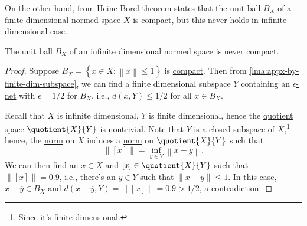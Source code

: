 On the other hand, from \hyperref[thm:Heine-Borel]{Heine-Borel theorem} states that the unit \hyperref[def:ball]{ball} \(B_X\) of a finite-dimensional \hyperref[def:normed-vector-space]{normed space} \(X\) is \hyperref[def:compact]{compact}, but this never holds in infinite-dimensional case.

\begin{theorem}\label{thm:Riesz}
	The unit \hyperref[def:ball]{ball} \(B_X\) of an infinite dimensional \hyperref[def:normed-vector-space]{normed space} is never \hyperref[def:compact]{compact}.
\end{theorem}
\begin{proof}
	Suppose \(B_X= \left\{ x\in X\colon \left\lVert x\right\rVert \leq 1 \right\} \) is \hyperref[def:compact]{compact}. Then from \autoref{lma:appx-by-finite-dim-subspace}, we can find a finite dimensional subspace \(Y\) containing an \hyperref[def:eps-net]{\(\epsilon\)-net} with \(\epsilon = 1 / 2\)  for \(B_X\), i.e., \(d(x, Y) \leq 1 / 2\) for all \(x\in B_X\).

	Recall that \(X\) is infinite dimensional, \(Y\) is finite dimensional, hence the \hyperref[def:quotient-space]{quotient space} \(\quotient{X}{Y} \) is nontrivial. Note that \(Y\) is a closed subspace of \(X\),\footnote{Since it's finite-dimensional.} hence, the \hyperref[def:norm]{norm} on \(X\) induces a \hyperref[def:norm]{norm} on \(\quotient{X}{Y}\) such that
	\[
		\left\lVert [x]\right\rVert = \inf _{y\in Y} \left\lVert x - y\right\rVert.
	\]
	We can then find an \(x\in X\) and \([x]\in \quotient{X}{Y} \) such that \(\left\lVert [x]\right\rVert = 0.9\), i.e., there's an \(\overline{y} \in Y\) such that \(\left\lVert x - \overline{y} \right\rVert \leq 1\). In this case, \(x - \overline{y} \in B_X\) and \(d(x-\overline{y} , Y) = \lVert [x] \rVert = 0.9 > 1 / 2\), a contradiction.
\end{proof}